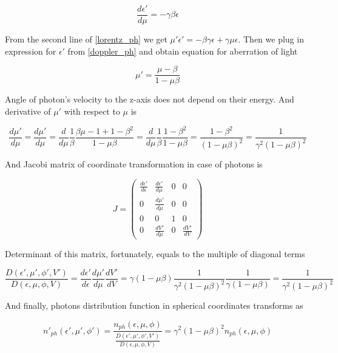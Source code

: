 \begin{equation}
	\frac{d\epsilon'}{d\mu}=-\gamma\beta\epsilon
\end{equation}

From the second line of \ref{lorentz_ph} we get
 $\mu'\epsilon'=-\beta\gamma\epsilon+\gamma\mu\epsilon$. Then we plug in expression for $\epsilon'$ from \ref{doppler_ph} and obtain equation for aberration of light
 
\begin{equation}\label{aberration_ph}
	\mu'=\frac{\mu-\beta}{1-\mu\beta}
\end{equation}

Angle of photon's velocity to the z-axis does not depend on their energy. And derivative of $\mu'$ with respect to $\mu$ is

\begin{equation}
	\frac{d\mu'}{d\mu} = \frac{d\mu'}{d\mu}=\frac{d}{d\mu}\frac{1}{\beta}\frac{\beta\mu-1+1-\beta^2}{1-\mu\beta}=\frac{d}{d\mu}\frac{1}{\beta}\frac{1-\beta^2}{1-\mu\beta}=\frac{1-\beta^2}{(1-\mu\beta)^2}=\frac{1}{\gamma^2(1-\mu\beta)^2}
\end{equation}

And Jacobi matrix of coordinate transformation in case of photons is

\begin{equation}
	J=\left(
	\begin{array}{cccc}
		\frac{d\epsilon'}{d\epsilon} & \frac{d\epsilon'}{d\mu}& 0 & 0\\
		0 & \frac{d\mu'}{d\mu} & 0 & 0\\
		0 & 0 & 1 & 0\\
		0 & \frac{dV'}{d\mu} & 0 & \frac{dV'}{dV}
	\end{array}
	\right)
\end{equation}

Determinant of this matrix, fortunately, equals to the multiple of diagonal terms

\begin{equation}\label{jacobian_ph}
	\frac{D(\epsilon',\mu',\phi',V')}{D(\epsilon,\mu,\phi,V)}=\frac{d\epsilon'}{d\epsilon}\frac{d\mu'}{d\mu}\frac{dV'}{dV}=\gamma(1-\mu\beta)\frac{1}{\gamma^2(1-\mu\beta)^2}\frac{1}{\gamma(1-\mu\beta)}=\frac{1}{\gamma^2(1-\mu\beta)^2}
\end{equation}

And finally, photons distribution function in spherical coordinates transforms as

\begin{equation}\label{distribution_ph}
	n'_{ph}(\epsilon',\mu',\phi') = \frac{n_{ph}(\epsilon,\mu,\phi)}{\frac{D(\epsilon',\mu',\phi',V')}{D(\epsilon,\mu,\phi,V)}}=\gamma^2(1-\mu\beta)^2 n_{ph}(\epsilon,\mu,\phi)
\end{equation}

